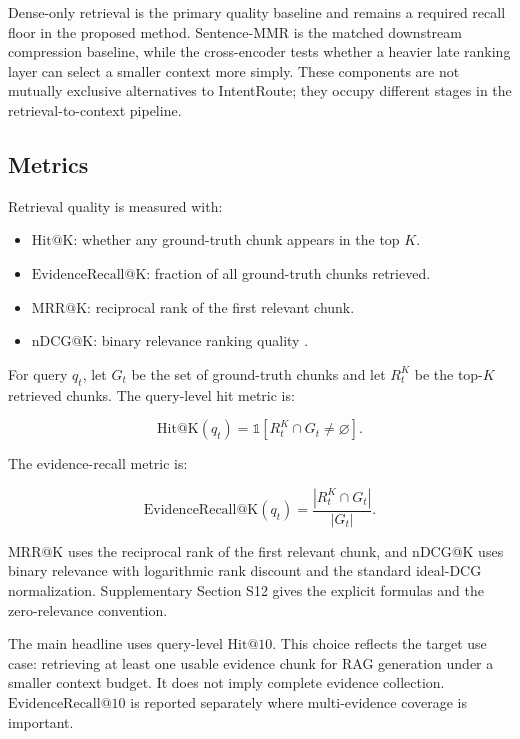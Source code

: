 Dense-only retrieval is the primary quality baseline and remains a required recall floor in the proposed method. Sentence-MMR is the matched downstream compression baseline, while the cross-encoder tests whether a heavier late ranking layer can select a smaller context more simply. These components are not mutually exclusive alternatives to IntentRoute; they occupy different stages in the retrieval-to-context pipeline.

\subsection{Metrics}
\label{sec:05-experimental-setup:metrics}

Retrieval quality is measured with:

\begin{itemize}
\item $\mathrm{Hit@K}$: whether any ground-truth chunk appears in the top $K$.
\item $\mathrm{EvidenceRecall@K}$: fraction of all ground-truth chunks retrieved.
\item $\mathrm{MRR@K}$: reciprocal rank of the first relevant chunk.
\item $\mathrm{nDCG@K}$: binary relevance ranking quality \citep{jarvelin2002ndcg}.
\end{itemize}

For query $q_t$, let $G_t$ be the set of ground-truth chunks and let $R_t^K$ be the top-$K$ retrieved chunks. The query-level hit metric is:

\[
\mathrm{Hit@K}(q_t) =
\mathbb{1}\left[ R_t^K \cap G_t \neq \varnothing \right].
\]

The evidence-recall metric is:

\[
\mathrm{EvidenceRecall@K}(q_t) =
\frac{\left| R_t^K \cap G_t \right|}{\left|G_t\right|}.
\]

MRR@K uses the reciprocal rank of the first relevant chunk, and nDCG@K uses binary relevance with logarithmic rank discount and the standard ideal-DCG normalization. Supplementary Section S12 gives the explicit formulas and the zero-relevance convention.

The main headline uses query-level $\mathrm{Hit@10}$. This choice reflects the target use case: retrieving at least one usable evidence chunk for RAG generation under a smaller context budget. It does not imply complete evidence collection. $\mathrm{EvidenceRecall@10}$ is reported separately where multi-evidence coverage is important.

